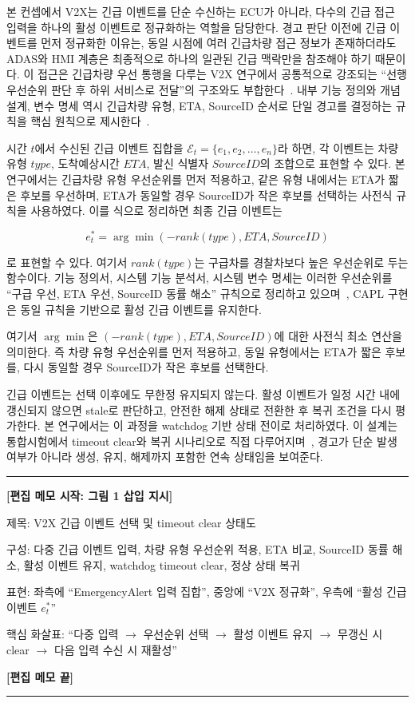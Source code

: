 \documentclass[11pt,a4paper]{article}
\newenvironment{editmemo}[1]
{
\par\noindent\rule{\linewidth}{0.4pt}\par
\noindent\textbf{[편집 메모 시작: #1]}\par
\small\itshape
}
{
\par\normalsize\normalfont
\noindent\textbf{[편집 메모 끝]}\par
\noindent\rule{\linewidth}{0.4pt}\par
}
\begin{document}
본 컨셉에서 V2X는 긴급 이벤트를 단순 수신하는 ECU가 아니라, 다수의 긴급 접근 입력을 하나의 활성 이벤트로 정규화하는 역할을 담당한다. 경고 판단 이전에 긴급 이벤트를 먼저 정규화한 이유는, 동일 시점에 여러 긴급차량 접근 정보가 존재하더라도 ADAS와 HMI 계층은 최종적으로 하나의 일관된 긴급 맥락만을 참조해야 하기 때문이다. 이 접근은 긴급차량 우선 통행을 다루는 V2X 연구에서 공통적으로 강조되는 ``선행 우선순위 판단 후 하위 서비스로 전달''의 구조와도 부합한다~\cite{v2x_evp_review}. 내부 기능 정의와 개념 설계, 변수 명세 역시 긴급차량 유형, ETA, SourceID 순서로 단일 경고를 결정하는 규칙을 핵심 원칙으로 제시한다~\cite{func_def,concept_design,sysvar_spec}.

시간 $t$에서 수신된 긴급 이벤트 집합을 $\mathcal{E}_t=\{e_1,e_2,\dots,e_n\}$라 하면, 각 이벤트는 차량 유형 $type$, 도착예상시간 $ETA$, 발신 식별자 $SourceID$의 조합으로 표현할 수 있다. 본 연구에서는 긴급차량 유형 우선순위를 먼저 적용하고, 같은 유형 내에서는 ETA가 짧은 후보를 우선하며, ETA가 동일할 경우 SourceID가 작은 후보를 선택하는 사전식 규칙을 사용하였다. 이를 식으로 정리하면 최종 긴급 이벤트는

\[
e_t^*=\arg\min(-rank(type), ETA, SourceID)
\]

로 표현할 수 있다. 여기서 $rank(type)$는 구급차를 경찰차보다 높은 우선순위로 두는 함수이다. 기능 정의서, 시스템 기능 분석서, 시스템 변수 명세는 이러한 우선순위를 ``구급 우선, ETA 우선, SourceID 동률 해소'' 규칙으로 정리하고 있으며~\cite{func_def,sysfunc_analysis,sysvar_spec}, CAPL 구현은 동일 규칙을 기반으로 활성 긴급 이벤트를 유지한다.

여기서 $\arg\min$은 $(-rank(type), ETA, SourceID)$에 대한 사전식 최소 연산을 의미한다. 즉 차량 유형 우선순위를 먼저 적용하고, 동일 유형에서는 ETA가 짧은 후보를, 다시 동일할 경우 SourceID가 작은 후보를 선택한다.

긴급 이벤트는 선택 이후에도 무한정 유지되지 않는다. 활성 이벤트가 일정 시간 내에 갱신되지 않으면 stale로 판단하고, 안전한 해제 상태로 전환한 후 복귀 조건을 다시 평가한다. 본 연구에서는 이 과정을 watchdog 기반 상태 전이로 처리하였다. 이 설계는 통합시험에서 timeout clear와 복귀 시나리오로 직접 다루어지며~\cite{integration_test}, 경고가 단순 발생 여부가 아니라 생성, 유지, 해제까지 포함한 연속 상태임을 보여준다.

\begin{editmemo}{그림 1 삽입 지시}
제목: V2X 긴급 이벤트 선택 및 timeout clear 상태도

구성: 다중 긴급 이벤트 입력, 차량 유형 우선순위 적용, ETA 비교, SourceID 동률 해소, 활성 이벤트 유지, watchdog timeout clear, 정상 상태 복귀

표현: 좌측에 ``EmergencyAlert 입력 집합'', 중앙에 ``V2X 정규화'', 우측에 ``활성 긴급 이벤트 $e_t^*$''

핵심 화살표: ``다중 입력 $\rightarrow$ 우선순위 선택 $\rightarrow$ 활성 이벤트 유지 $\rightarrow$ 무갱신 시 clear $\rightarrow$ 다음 입력 수신 시 재활성''
\end{editmemo}
\end{document}
